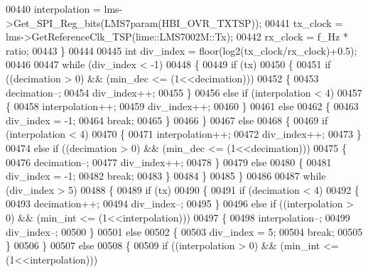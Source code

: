 \begin{DoxyCode}
00440         interpolation = lms->Get_SPI_Reg_bits(LMS7param(HBI_OVR_TXTSP));
00441         tx\_clock = lms->GetReferenceClk_TSP(lime::LMS7002M::Tx);
00442         rx\_clock = f\_Hz * ratio;
00443     \}
00444 
00445     \textcolor{keywordtype}{int} div\_index = floor(log2(tx\_clock/rx\_clock)+0.5);
00446 
00447     \textcolor{keywordflow}{while} (div\_index < -1)
00448     \{
00449         \textcolor{keywordflow}{if} (tx)
00450         \{
00451            \textcolor{keywordflow}{if} ((decimation > 0) && (min\_dec <= (1<<decimation)))
00452            \{
00453              decimation--;
00454              div\_index++;
00455            \}
00456            \textcolor{keywordflow}{else} \textcolor{keywordflow}{if} (interpolation < 4)
00457            \{
00458              interpolation++;
00459              div\_index++;
00460            \}
00461            \textcolor{keywordflow}{else}
00462            \{
00463                div\_index = -1;
00464                \textcolor{keywordflow}{break};
00465            \}
00466         \}
00467         \textcolor{keywordflow}{else}
00468         \{
00469            \textcolor{keywordflow}{if} (interpolation < 4)
00470            \{
00471              interpolation++;
00472              div\_index++;
00473            \}
00474            \textcolor{keywordflow}{else} \textcolor{keywordflow}{if} ((decimation > 0) && (min\_dec <= (1<<decimation)))
00475            \{
00476              decimation--;
00477              div\_index++;
00478            \}
00479            \textcolor{keywordflow}{else}
00480            \{
00481                div\_index = -1;
00482                \textcolor{keywordflow}{break};
00483            \}
00484         \}
00485     \}
00486 
00487     \textcolor{keywordflow}{while} (div\_index > 5)
00488     \{
00489         \textcolor{keywordflow}{if} (tx)
00490         \{
00491            \textcolor{keywordflow}{if} (decimation < 4)
00492            \{
00493              decimation++;
00494              div\_index--;
00495            \}
00496            \textcolor{keywordflow}{else} \textcolor{keywordflow}{if} ((interpolation > 0) && (min\_int <= (1<<interpolation)))
00497            \{
00498              interpolation--;
00499              div\_index--;
00500            \}
00501            \textcolor{keywordflow}{else}
00502            \{
00503              div\_index = 5;
00504              \textcolor{keywordflow}{break};
00505            \}
00506         \}
00507         \textcolor{keywordflow}{else}
00508         \{
00509            \textcolor{keywordflow}{if} ((interpolation > 0) && (min\_int <= (1<<interpolation)))

\end{DoxyCode}
